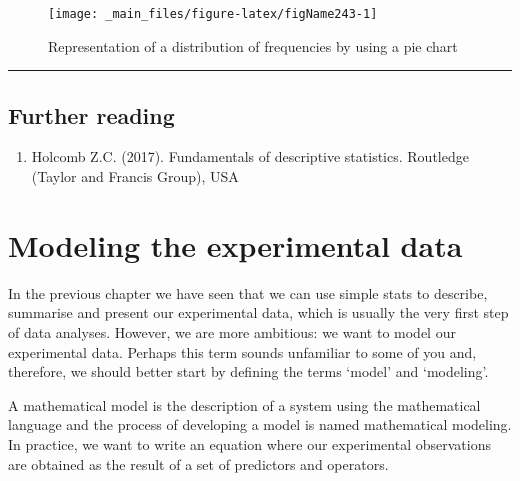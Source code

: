 \documentclass[a4paper,12pt,oneside]{book}
\providecommand{\tightlist}{%
  \setlength{\itemsep}{0pt}\setlength{\parskip}{0pt}}
\newenvironment{Shaded}{\begin{snugshade}}{\end{snugshade}}
\newcommand{\SpecialCharTok}[1]{#1}
\newcommand{\FunctionTok}[1]{#1}
\newcommand{\NormalTok}[1]{#1}
\begin{document}
\begin{Shaded}
\end{Shaded}

\begin{figure}

{\centering \texttt{[image: \_main\_files/figure-latex/figName243-1]} 

}

\caption{Representation of a distribution of frequencies by using a pie chart}\label{fig:figName243}
\end{figure}

\begin{center}\rule{0.5\linewidth}{0.5pt}\end{center}

\hypertarget{further-reading}{%
\section{Further reading}\label{further-reading}}

\begin{enumerate}
\def\labelenumi{\arabic{enumi}.}
\tightlist
\item
  Holcomb Z.C. (2017). Fundamentals of descriptive statistics. Routledge (Taylor and Francis Group), USA
\end{enumerate}

\hypertarget{modeling-the-experimental-data}{%
\chapter{Modeling the experimental data}\label{modeling-the-experimental-data}}

In the previous chapter we have seen that we can use simple stats to describe, summarise and present our experimental data, which is usually the very first step of data analyses. However, we are more ambitious: we want to model our experimental data. Perhaps this term sounds unfamiliar to some of you and, therefore, we should better start by defining the terms `model' and `modeling'.

A mathematical model is the description of a system using the mathematical language and the process of developing a model is named mathematical modeling. In practice, we want to write an equation where our experimental observations are obtained as the result of a set of predictors and operators.
\end{document}
